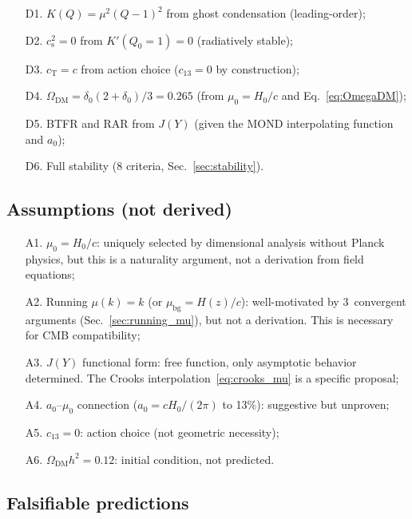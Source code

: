 \documentclass[prd,twocolumn,superscriptaddress,longbibliography,floatfix]{revtex4-2}
\newcommand{\cs}{c_{\mathrm{s}}}
\newcommand{\cT}{c_{\mathrm{T}}}
\begin{document}
\begin{enumerate}
\item[\textsc{D1.}] $K(Q) = \mu^2(Q-1)^2$ from ghost
  condensation (leading-order);
\item[\textsc{D2.}] $\cs^2 = 0$ from $K'(Q_0 = 1) = 0$
  (radiatively stable);
\item[\textsc{D3.}] $\cT = c$ from action choice
  ($c_{13} = 0$ by construction);
\item[\textsc{D4.}] $\Omega_{\mathrm{DM}} = \delta_0(2{+}\delta_0)/3
  = 0.265$ (from $\mu_0 = H_0/c$ and Eq.~\eqref{eq:OmegaDM});
\item[\textsc{D5.}] BTFR and RAR from $J(Y)$ (given the
  MOND interpolating function and $a_0$);
\item[\textsc{D6.}] Full stability (8 criteria,
  Sec.~\ref{sec:stability}).
\end{enumerate}

\subsection{Assumptions (not derived)}

\begin{enumerate}
\item[\textsc{A1.}] $\mu_0 = H_0/c$: uniquely selected by
  dimensional analysis without Planck physics, but this is a
  naturality argument, not a derivation from field equations;
\item[\textsc{A2.}] Running $\mu(k) = k$
  (or $\mu_{\mathrm{bg}} = H(z)/c$): well-motivated by
  3~convergent arguments (Sec.~\ref{sec:running_mu}), but not
  a derivation.  This is necessary for CMB compatibility;
\item[\textsc{A3.}] $J(Y)$ functional form: free function,
  only asymptotic behavior determined.  The Crooks
  interpolation~\eqref{eq:crooks_mu} is a specific proposal;
\item[\textsc{A4.}] $a_0$--$\mu_0$ connection ($a_0 = cH_0/(2\pi)$
  to 13\%): suggestive but unproven;
\item[\textsc{A5.}] $c_{13} = 0$: action choice (not
  geometric necessity);
\item[\textsc{A6.}] $\Omega_{\mathrm{DM}}h^2 = 0.12$: initial
  condition, not predicted.
\end{enumerate}

\subsection{Falsifiable predictions}
\end{document}
